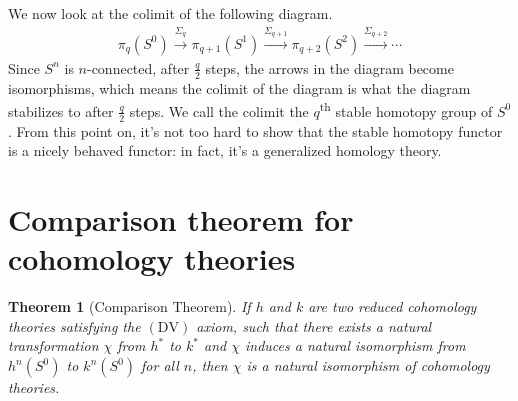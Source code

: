 \documentclass[12pt, notitlepage]{article}
\newtheorem{thm}{Theorem}[section]
\theoremstyle{definition}
\begin{document}
We now look at the colimit of the following diagram.
\begin{align*}
  \pi_q(S^0) \xrightarrow{\Sigma_q} \pi_{q+1}(S^1) \xrightarrow{\Sigma_{q+1}} \pi_{q+2}(S^2) \xrightarrow{\Sigma_{q+2}} \cdots
\end{align*}
Since $S^n$ is $n$-connected, after $\frac{q}{2}$ steps, the arrows in the diagram become
isomorphisms, which means the colimit of the diagram is what the diagram stabilizes to after
$\frac{q}{2}$ steps. We call the colimit the $q$\textsuperscript{th} stable homotopy group of
$S^0$. From this point on, it's not too hard to show that the stable homotopy functor is a nicely
behaved functor: in fact, it's a generalized homology theory.
  
\section{Comparison theorem for cohomology theories}
\label{sec:comp-theor-cohom}

\begin{thm}[Comparison Theorem]
  If $h$ and $k$ are two reduced cohomology theories satisfying the $(\mathrm{DV})$ axiom, such that
  there exists a natural transformation $\chi$ from $h^{\ast}$ to $k^{\ast}$ and $\chi$ induces a
  natural isomorphism from $h^n(S^0)$ to $k^n(S^0)$ for all $n$, then $\chi$ is a natural
  isomorphism of cohomology theories.
\end{thm}
\end{document}
